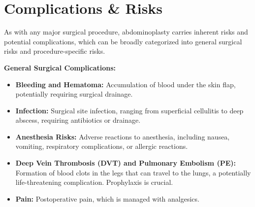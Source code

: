 \section*{Complications \& Risks}
As with any major surgical procedure, abdominoplasty carries inherent risks and potential complications, which can be broadly categorized into general surgical risks and procedure-specific risks.

\textbf{General Surgical Complications:}
\begin{itemize}
  \item \textbf{Bleeding and Hematoma:} Accumulation of blood under the skin flap, potentially requiring surgical drainage.
  \item \textbf{Infection:} Surgical site infection, ranging from superficial cellulitis to deep abscess, requiring antibiotics or drainage.
  \item \textbf{Anesthesia Risks:} Adverse reactions to anesthesia, including nausea, vomiting, respiratory complications, or allergic reactions.
  \item \textbf{Deep Vein Thrombosis (DVT) and Pulmonary Embolism (PE):} Formation of blood clots in the legs that can travel to the lungs, a potentially life-threatening complication. Prophylaxis is crucial.
  \item \textbf{Pain:} Postoperative pain, which is managed with analgesics.
\end{itemize}

